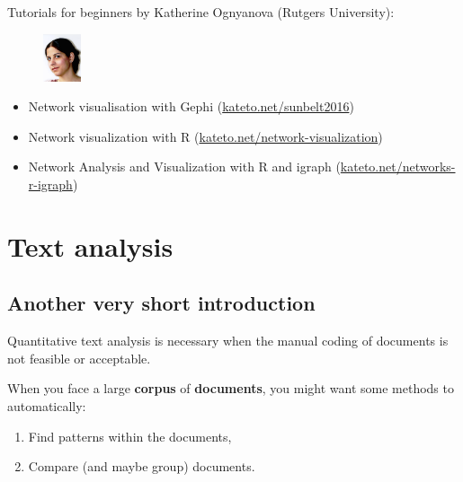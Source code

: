 \documentclass[serif, aspectratio=169]{beamer}
\begin{document}
\begin{frame}

Tutorials for beginners by Katherine Ognyanova (Rutgers University):

\begin{figure}
    \centering
    \includegraphics[width=0.1\textwidth]{figure/Ognyanova_Katherine}
\end{figure}


\begin{itemize}
\item Network visualisation with Gephi (\url{kateto.net/sunbelt2016})
\item Network visualization with R (\url{kateto.net/network-visualization})
\item Network Analysis and Visualization with R and igraph (\url{kateto.net/networks-r-igraph})
\end{itemize}

\end{frame}

\section{Text analysis}

\subsection{Another very short introduction}

\begin{frame}

Quantitative text analysis is necessary when the manual coding of documents is not feasible or acceptable. 

When you face a large \textbf{corpus} of \textbf{documents}, you might want some methods to automatically:

\begin{enumerate}

\item Find patterns within the documents,

\item Compare (and maybe group) documents.

\end{enumerate}

\end{frame}
\end{document}
